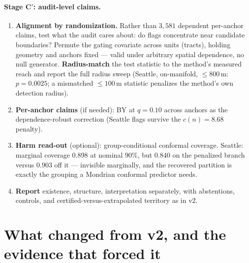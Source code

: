 \documentclass[11pt]{article}
\begin{document}
\paragraph{Stage C$'$: audit-level claims.}
\begin{enumerate}[label=\textbf{C\arabic*.},leftmargin=2.7em,itemsep=2pt]
  \item \textbf{Alignment by randomization.} Rather than $3{,}581$ dependent per-anchor
  claims, test what the audit cares about: do flags concentrate near candidate boundaries?
  Permute the gating covariate across units (tracts), holding geometry and anchors fixed
  --- valid under arbitrary spatial dependence, no null generator. \textbf{Radius-match} the
  test statistic to the method's measured reach and report the full radius sweep
  (Seattle, on-manifold, $\le 800$\,m: $p=0.0025$; a mismatched $\le 100$\,m statistic
  penalizes the method's own detection radius).
  \item \textbf{Per-anchor claims} (if needed): BY at $q=0.10$ across anchors as the
  dependence-robust correction (Seattle flags survive the $c(n)=8.68$ penalty).
  \item \textbf{Harm read-out} (optional): group-conditional conformal coverage. Seattle:
  marginal coverage $0.898$ at nominal $90\%$, but $0.840$ on the penalized branch versus
  $0.903$ off it --- invisible marginally, and the recovered partition is exactly the
  grouping a Mondrian conformal predictor needs.
  \item \textbf{Report} existence, structure, interpretation separately, with abstentions,
  controls, and certified-versus-extrapolated territory as in v2.
\end{enumerate}

\section{What changed from v2, and the evidence that forced it}
\label{sec:changes}
\end{document}
